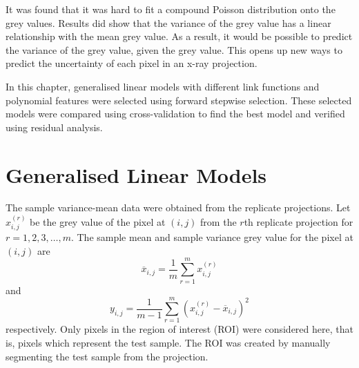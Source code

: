 It was found that it was hard to fit a compound Poisson distribution onto the grey values. Results did show that the variance of the grey value has a linear relationship with the mean grey value. As a result, it would be possible to predict the variance of the grey value, given the grey value. This opens up new ways to predict the uncertainty of each pixel in an x-ray projection.

In this chapter, generalised linear models \citep{nelder1972generalized, nelder1972generalized_2, mccullagh1984generalized} with different link functions and polynomial features were selected using forward stepwise selection. These selected models were compared using cross-validation to find the best model and verified using residual analysis.

\section{Generalised Linear Models}

The sample variance-mean data were obtained from the replicate projections. Let $x_{i,j}^{(r)}$ be the grey value of the pixel at $(i,j)$ from the $r$th replicate projection for $r=1,2,3,\dotsc,m$. The sample mean and sample variance grey value for the pixel at $(i,j)$ are
\begin{equation}
    \overline{x}_{i,j}=\frac{1}{m}\sum_{r=1}^m x_{i,j}^{(r)}
\end{equation}
and
\begin{equation}
    y_{i,j} =
    \frac{1}{m-1}
    \sum_{r=1}^m
        \left(
            x_{i,j}^{(r)} - \overline{x}_{i,j}
        \right)^2
\end{equation}
respectively. Only pixels in the region of interest (ROI) were considered here, that is, pixels which represent the test sample. The ROI was created by manually segmenting the test sample from the projection.

